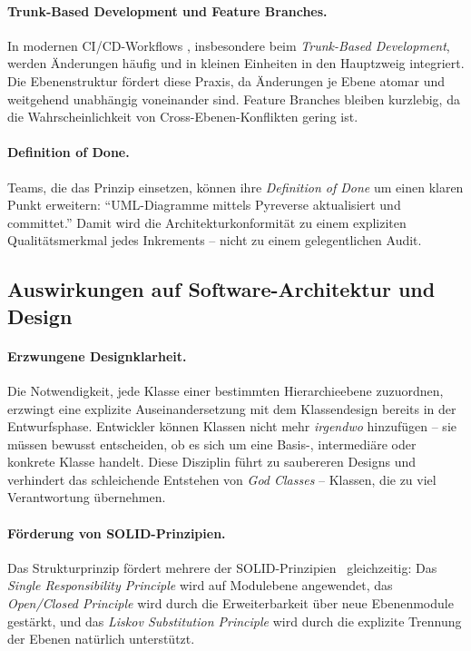 ﻿\documentclass[a4paper,12pt]{article}
\begin{document}
\paragraph{Trunk-Based Development und Feature Branches.}
In modernen CI/CD-Workflows \cite{humble2010}, insbesondere beim
\textit{Trunk-Based Development}, werden Änderungen häufig und in kleinen
Einheiten in den Hauptzweig integriert. Die Ebenenstruktur fördert diese Praxis,
da Änderungen je Ebene atomar und weitgehend unabhängig voneinander sind. Feature
Branches bleiben kurzlebig, da die Wahrscheinlichkeit von Cross-Ebenen-Konflikten
gering ist.

\paragraph{Definition of Done.}
Teams, die das Prinzip einsetzen, können ihre \textit{Definition of Done} um
einen klaren Punkt erweitern: \enquote{UML-Diagramme mittels Pyreverse aktualisiert
	und committet.} Damit wird die Architekturkonformität zu einem expliziten
Qualitätsmerkmal jedes Inkrements -- nicht zu einem gelegentlichen Audit.

\subsection{Auswirkungen auf Software-Architektur und Design}

\paragraph{Erzwungene Designklarheit.}
Die Notwendigkeit, jede Klasse einer bestimmten Hierarchieebene zuzuordnen,
erzwingt eine explizite Auseinandersetzung mit dem Klassendesign bereits in der
Entwurfsphase. Entwickler können Klassen nicht mehr \textit{irgendwo}
hinzufügen -- sie müssen bewusst entscheiden, ob es sich um eine Basis-,
intermediäre oder konkrete Klasse handelt. Diese Disziplin führt zu saubereren
Designs und verhindert das schleichende Entstehen von \textit{God Classes}
\cite{riel1996} -- Klassen, die zu viel Verantwortung übernehmen.

\paragraph{Förderung von SOLID-Prinzipien.}
Das Strukturprinzip fördert mehrere der SOLID-Prinzipien~\cite{martin2017}
gleichzeitig: Das \textit{Single Responsibility Principle} wird auf Modulebene
angewendet, das \textit{Open/Closed Principle} wird durch die Erweiterbarkeit
über neue Ebenenmodule gestärkt, und das \textit{Liskov Substitution Principle}
wird durch die explizite Trennung der Ebenen natürlich unterstützt.
\end{document}
